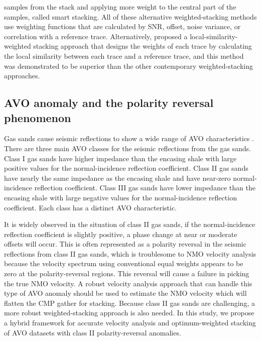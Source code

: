 samples from the stack and applying more weight to the
central part of the samples, called smart stacking. All of these alternative weighted-stacking methods use weighting functions that are calculated by
SNR, offset, noise variance, or correlation with a reference trace. Alternatively, \cite{Liu09} proposed a local-similarity-weighted stacking approach that designs the weights of each trace by calculating the local similarity between each trace and a reference trace, and this method was demonstrated to be superior than the other contemporary weighted-stacking approaches.

\subsection{AVO anomaly and the polarity reversal phenomenon}
Gas sands cause seismic reflections to show a wide range of AVO characteristics \cite[]{Rutherford89}. There are three main AVO classes for the seismic reflections from the gas sands. Class I gas sands have higher impedance than the encasing shale with large positive values for the normal-incidence reflection coefficient. Class II gas sands have nearly the same impedance as the encasing shale and have near-zero normal-incidence reflection coefficient. Class III gas sands have lower impedance than the encasing shale with large negative values for the normal-incidence reflection coefficient. Each class has a distinct AVO characteristic.

It is widely observed in the situation of class II gas sands, if the normal-incidence reflection coefficient is slightly positive, a phase change at near or moderate offsets will occur. This is often represented as a polarity reversal in the seismic reflections from class II gas sands, which is troublesome to NMO velocity analysis because the velocity spectrum using conventional equal weights appears to be zero at the polarity-reversal regions. This reversal will cause a failure in picking the true NMO velocity. A robust velocity analysis approach that can handle this type of AVO anomaly should be used to estimate the NMO velocity which will flatten the CMP gather for stacking. Because class II gas sands are challenging, a more robust weighted-stacking approach is also needed. In this study, we propose a hybrid framework for accurate velocity analysis and optimum-weighted stacking of AVO datasets with class II polarity-reversal anomalies.

